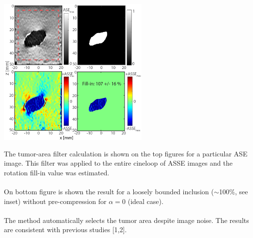 \documentclass[portrait,a0paper,fontscale=0.28]{baposter} %
\begin{document}
\begin{poster}
{\begin{multicols}{2}
 \begin{center}
{\includegraphics[height=20em]{ExpImages_v3.png}}
\end{center}
 The tumor-area filter calculation is shown on the top figures for a particular ASE image. This filter was applied to the entire cineloop of ASSE images and the rotation fill-in value was estimated. \\ 
 \\On bottom figure is shown the result for a loosely bounded inclusion ($\sim$100\%, see inset) without pre-compression for $\alpha=0$ (ideal case). \\
 \\
 The method automatically selects the tumor area despite image noise. The results are consistent with previous studies [1,2].



\end{multicols}
}





\end{poster}
\end{document}
